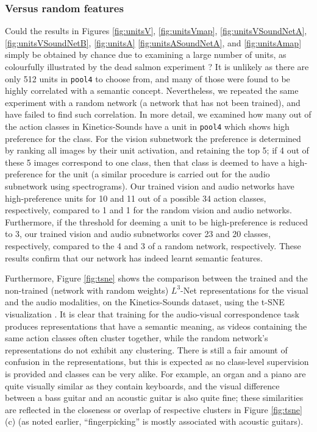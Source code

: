 \documentclass[10pt,twocolumn,letterpaper]{article}
\begin{document}
\figUnitsVSoundNetB
\figUnitsA
\figUnitsASoundNetA

\afterpage{\FloatBarrier}


\subsubsection{Versus random features}
Could the results in Figures
\ref{fig:unitsV},
\ref{fig:unitsVmap},
\ref{fig:unitsVSoundNetA},
\ref{fig:unitsVSoundNetB},
\ref{fig:unitsA}
\ref{fig:unitsASoundNetA},
and
\ref{fig:unitsAmap}
simply be obtained by chance due to examining a large number of units,
as colourfully illustrated by the dead salmon experiment
\cite{Bennett09}?  It is unlikely as there are only 512 units in
\texttt{pool4} to choose from, and many of those were found to be
highly correlated with a semantic concept. Nevertheless, we repeated
the same experiment with a random network (\ie a network that has not
been trained), and have failed to find such correlation.  In more
detail, we examined how many out of the action classes in
Kinetics-Sounds have a unit in \texttt{pool4} which shows high
preference for the class. For the vision subnetwork the preference is
determined by ranking all images by their unit activation, and
retaining the top 5; if 4 out of these 5 images correspond to
one class, then that class is deemed to have a high-preference for the
unit (a similar procedure is carried out for the audio subnetwork
using spectrograms).  Our trained vision and audio networks have
high-preference units for 10 and 11 out of a possible 34 action
classes, respectively, compared to 1 and 1 for the random vision and
audio networks.  Furthermore, if the threshold for deeming a unit to
be high-preference is reduced to 3, our trained vision and audio
subnetworks cover 23 and 20 classes, respectively, compared to the 4
and 3 of a random network, respectively.  These results confirm that
our network has indeed learnt semantic features.

Furthermore,
Figure \ref{fig:tsne} shows the comparison between the trained and the
non-trained (\ie network with random weights) $L^3$-Net representations
for the visual and the audio modalities, on the Kinetics-Sounds dataset,
using the t-SNE visualization \cite{Van-der-Maaten08}.
It is clear that training for the audio-visual correspondence task
produces representations that have a semantic meaning, as videos containing
the same action classes
often cluster together, while the random network's representations do not
exhibit any clustering.
There is still a fair amount of confusion in the representations,
but this is expected as no class-level supervision is provided
and classes can be very alike.
For example, an organ and a piano are quite visually similar as they
contain keyboards, and the visual difference between a bass guitar and an
acoustic guitar is also quite fine; these similarities are reflected
in the closeness or overlap of respective clusters in
Figure \ref{fig:tsne}(c)
(\eg as noted earlier, ``fingerpicking'' is mostly associated with acoustic guitars).
\end{document}

